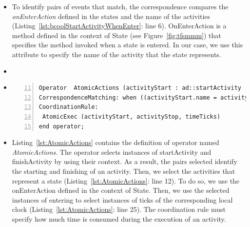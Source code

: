 \begin{itemize}
		 \item To identify pairs of events that match, the correspondence compares the \emph{onEnterAction} defined in the states and the name of the activities (Listing~\ref{lst:bcoolStartActivityWhenEnter}: line 6). OnEnterAction is a method defined in the context of State (see Figure~\ref{fig:tfsmmm}) that specifies the method invoked when a state is entered. In our case, we use this attribute to specify the name of the activity that the state represents. 
		  
		 \item {}     

		\item {}
		
\begin{lstlisting}[language=bcool,
caption={Timing coordination operator between TFSM and fUML language},
label={lst:AtomicActions}, 
basicstyle=\scriptsize\ttfamily, backgroundcolor=\color{LGrey}, numbers=left, xleftmargin=2pt, firstnumber=11]
Operator  AtomicActions (activityStart : ad::startActivity , activityStop : ad::finishActivity, enterState : tfsm::entering, leaveState : tfsm::leaving, timeTicks : tfsm::ticks)
CorrespondenceMatching: when ((activityStart.name = activityStop.name ) and (activityStart.name = enterState.OnEnterAction.name ) and (enterState.owningFSM.localClock = timeTicks));
CoordinationRule: 
 AtomicExec (activityStart, activityStop, timeTicks)
end operator;
\end{lstlisting}
		
		\item Listing~\ref{lst:AtomicActions} contains the definition of operator named \emph{AtomicActions}. The operator selects instances of \dse startActivity and finishActivity by using their context. As a result, the pairs selected identify the starting and finishing of an activity. Then, we select the activities that represent a state (Listing~\ref{lst:AtomicActions}: line 12). To do so, we use the onEnterAction defined in the context of State. Then, we use the selected instances of \dse entering to select instances of \dse ticks of the corresponding local clock (Listing~\ref{lst:AtomicActions}: line 25). The coordination rule must specify how much time is consumed during the execution of an activity.
		

\end{itemize}
